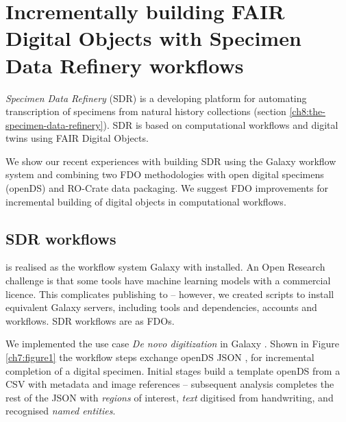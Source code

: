 \section[Incrementally building FAIR Digital Objects with the Specimen Data Refinery]{Incrementally building FAIR Digital Objects with Specimen Data Refinery workflows}
\label{ch7:incrementally-building-fair-digital-objects-with-specimen-data-refinery-workflows}

\emph{Specimen Data Refinery} (SDR) is a developing platform for
automating transcription of specimens from natural history collections
\cite{Hardisty 2022} (section \vref{ch8:the-specimen-data-refinery}). SDR is
based on computational workflows and digital twins using FAIR Digital
Objects.

We show our recent experiences with building SDR using the Galaxy
workflow system and combining two FDO methodologies with open digital
specimens (openDS) and RO-Crate data packaging. We suggest FDO
improvements for incremental building of digital objects in
computational workflows.

\subsection{SDR workflows}\label{ch7:sdr-workflows}

 is realised as the workflow system
Galaxy \cite{Afgan 2018} with
 installed. An Open
Research challenge is that some tools have machine learning models with
a commercial licence. This complicates publishing to
 -- however, we
created  scripts to install
equivalent Galaxy servers, including tools and dependencies, accounts
and workflows. SDR workflows are
 as
FDOs.

We implemented the use case \emph{De novo digitization} in Galaxy \cite{Brack 2022b}.
Shown in Figure \vref{ch7:figure1} the
workflow steps exchange openDS JSON \cite{Hardisty 2019a}, for
incremental completion of a digital specimen. Initial stages build a
template openDS from a CSV with metadata and image references --
subsequent analysis completes the rest of the JSON with \emph{regions}
of interest, \emph{text} digitised from handwriting, and recognised
\emph{named entities}.

